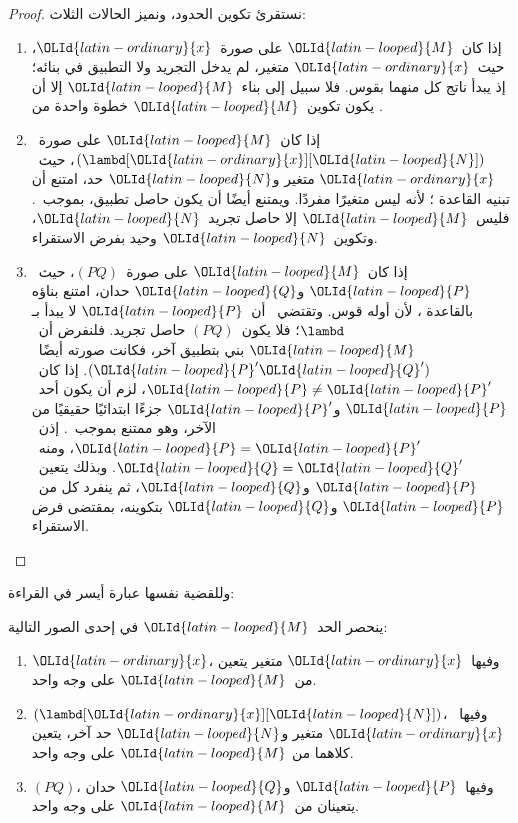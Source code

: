 \documentclass[../../../include/open-logic-section]{subfiles}
\begin{document}
\begin{proof}
  نستقرئ تكوين الحدود، ونميز الحالات الثلاث:
  \begin{enumerate}
    \item إذا كان~${\OLId{latin-looped}{M}}$ على صورة~${\OLId{latin-ordinary}{x}}$، حيث~${\OLId{latin-ordinary}{x}}$ متغير،
      لم يدخل التجريد ولا التطبيق في بنائه؛ إذ يبدأ ناتج كل منهما بقوس.
      فلا سبيل إلى بناء~${\OLId{latin-looped}{M}}$ إلا أن يكون تكوين~${\OLId{latin-looped}{M}}$ خطوة واحدة من
      .
    \item إذا كان~${\OLId{latin-looped}{M}}$ على صورة~$(\lambd[{\OLId{latin-ordinary}{x}}][{\OLId{latin-looped}{N}}])$، حيث~${\OLId{latin-ordinary}{x}}$ متغير و${\OLId{latin-looped}{N}}$ حد،
      امتنع أن تبنيه القاعدة
      ؛ لأنه ليس متغيرًا مفردًا.
      ويمتنع أيضًا أن يكون حاصل تطبيق، بموجب~.
      فليس~${\OLId{latin-looped}{M}}$ إلا حاصل تجريد~${\OLId{latin-looped}{N}}$، وتكوين~${\OLId{latin-looped}{N}}$ وحيد بفرض الاستقراء.
    \item إذا كان~${\OLId{latin-looped}{M}}$ على صورة~$(PQ)$، حيث~${\OLId{latin-looped}{P}}$ و${\OLId{latin-looped}{Q}}$ حدان،
      امتنع بناؤه بالقاعدة
      ، لأن أوله قوس.
      وتقتضي~ أن~${\OLId{latin-looped}{P}}$ لا يبدأ بـ$\lambd$؛
      فلا يكون~$(PQ)$ حاصل تجريد. فلنفرض أن~${\OLId{latin-looped}{M}}$ بني بتطبيق آخر،
      فكانت صورته أيضًا~$({\OLId{latin-looped}{P}}'{\OLId{latin-looped}{Q}}')$. إذا كان~${\OLId{latin-looped}{P}} \neq
      {\OLId{latin-looped}{P}}'$، لزم أن يكون أحد~${\OLId{latin-looped}{P}}$ و${\OLId{latin-looped}{P}}'$
      جزءًا ابتدائيًا حقيقيًا من الآخر، وهو ممتنع بموجب~.
      إذن~${\OLId{latin-looped}{P}}={\OLId{latin-looped}{P}}'$، ومنه~${\OLId{latin-looped}{Q}}={\OLId{latin-looped}{Q}}'$. وبذلك يتعين~${\OLId{latin-looped}{P}}$ و${\OLId{latin-looped}{Q}}$،
      ثم ينفرد كل من~${\OLId{latin-looped}{P}}$ و${\OLId{latin-looped}{Q}}$ بتكوينه، بمقتضى فرض الاستقراء.
  \end{enumerate}
\end{proof}

وللقضية نفسها عبارة أيسر في القراءة:
\begin{prop}
  ينحصر الحد~${\OLId{latin-looped}{M}}$ في إحدى الصور التالية:
  \begin{enumerate}
    \item ${\OLId{latin-ordinary}{x}}$، وفيها~${\OLId{latin-ordinary}{x}}$ متغير يتعين من~${\OLId{latin-looped}{M}}$ على وجه واحد.
    \item $(\lambd[{\OLId{latin-ordinary}{x}}][{\OLId{latin-looped}{N}}])$، وفيها~${\OLId{latin-ordinary}{x}}$ متغير و${\OLId{latin-looped}{N}}$ حد آخر، يتعين كلاهما من
      ${\OLId{latin-looped}{M}}$ على وجه واحد.
    \item $(PQ)$، وفيها~${\OLId{latin-looped}{P}}$ و${\OLId{latin-looped}{Q}}$ حدان يتعينان من~${\OLId{latin-looped}{M}}$ على وجه واحد.
  \end{enumerate}
\end{prop}
\end{document}
